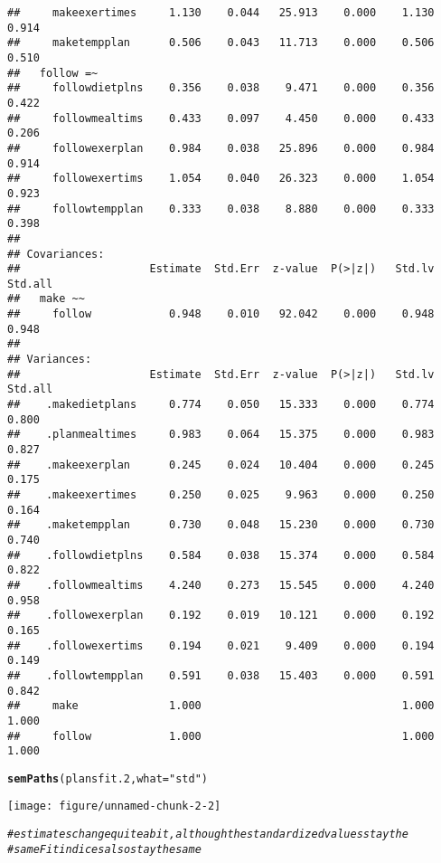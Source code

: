 \documentclass{article}\usepackage[]{graphicx}\usepackage[]{color}
\makeatletter
\def\maxwidth{ %
  \ifdim\Gin@nat@width>\linewidth
    \linewidth
  \else
    \Gin@nat@width
  \fi
}
\newcommand{\hlstr}[1]{\textcolor[rgb]{0.192,0.494,0.8}{#1}}%
\newcommand{\hlcom}[1]{\textcolor[rgb]{0.678,0.584,0.686}{\textit{#1}}}%
\newcommand{\hlstd}[1]{\textcolor[rgb]{0.345,0.345,0.345}{#1}}%
\newcommand{\hlkwc}[1]{\textcolor[rgb]{0.333,0.667,0.333}{#1}}%
\newcommand{\hlkwd}[1]{\textcolor[rgb]{0.737,0.353,0.396}{\textbf{#1}}}%
\newenvironment{kframe}{%
 \def\at@end@of@kframe{}%
 \ifinner\ifhmode%
  \def\at@end@of@kframe{\end{minipage}}%
  \begin{minipage}{\columnwidth}%
 \fi\fi%
 \def\FrameCommand##1{\hskip\@totalleftmargin \hskip-\fboxsep
 \colorbox{shadecolor}{##1}\hskip-\fboxsep
     \hskip-\linewidth \hskip-\@totalleftmargin \hskip\columnwidth}%
 \MakeFramed {\advance\hsize-\width
   \@totalleftmargin\z@ \linewidth\hsize
   \@setminipage}}%
 {\par\unskip\endMakeFramed%
 \at@end@of@kframe}
\newenvironment{knitrout}{}{} %
\makeatother
\begin{document}
\begin{knitrout}
\begin{kframe}
\begin{verbatim}
##     makeexertimes     1.130    0.044   25.913    0.000    1.130    0.914
##     maketempplan      0.506    0.043   11.713    0.000    0.506    0.510
##   follow =~                                                             
##     followdietplns    0.356    0.038    9.471    0.000    0.356    0.422
##     followmealtims    0.433    0.097    4.450    0.000    0.433    0.206
##     followexerplan    0.984    0.038   25.896    0.000    0.984    0.914
##     followexertims    1.054    0.040   26.323    0.000    1.054    0.923
##     followtempplan    0.333    0.038    8.880    0.000    0.333    0.398
## 
## Covariances:
##                    Estimate  Std.Err  z-value  P(>|z|)   Std.lv  Std.all
##   make ~~                                                               
##     follow            0.948    0.010   92.042    0.000    0.948    0.948
## 
## Variances:
##                    Estimate  Std.Err  z-value  P(>|z|)   Std.lv  Std.all
##    .makedietplans     0.774    0.050   15.333    0.000    0.774    0.800
##    .planmealtimes     0.983    0.064   15.375    0.000    0.983    0.827
##    .makeexerplan      0.245    0.024   10.404    0.000    0.245    0.175
##    .makeexertimes     0.250    0.025    9.963    0.000    0.250    0.164
##    .maketempplan      0.730    0.048   15.230    0.000    0.730    0.740
##    .followdietplns    0.584    0.038   15.374    0.000    0.584    0.822
##    .followmealtims    4.240    0.273   15.545    0.000    4.240    0.958
##    .followexerplan    0.192    0.019   10.121    0.000    0.192    0.165
##    .followexertims    0.194    0.021    9.409    0.000    0.194    0.149
##    .followtempplan    0.591    0.038   15.403    0.000    0.591    0.842
##     make              1.000                               1.000    1.000
##     follow            1.000                               1.000    1.000
\end{verbatim}
\begin{alltt}
\hlkwd{semPaths}\hlstd{(plansfit.2,} \hlkwc{what} \hlstd{=} \hlstr{"std"}\hlstd{)}
\end{alltt}
\end{kframe}
\texttt{[image: figure/unnamed-chunk-2-2]} 
\begin{kframe}\begin{alltt}
\hlcom{# estimates change quite a bit, although the standardized values stay the}
\hlcom{# same Fit indices also stay the same}
\end{alltt}
\end{kframe}
\end{knitrout}
\end{document}
